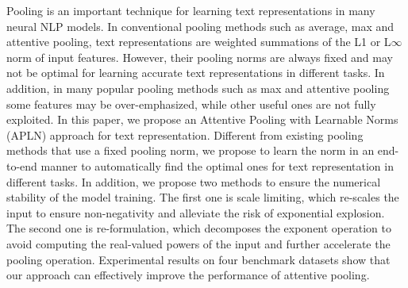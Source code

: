 Pooling is an important technique for learning text representations in many neural NLP models. In conventional pooling methods such as average, max and attentive pooling, text representations are weighted summations of the L1 or L{\mbox{$\infty$}} norm of input features. However, their pooling norms are always fixed and may not be optimal for learning accurate text representations in different tasks. In addition, in many popular pooling methods such as max and attentive pooling some features may be over-emphasized, while other useful ones are not fully exploited. In this paper, we propose an Attentive Pooling with Learnable Norms (APLN) approach for text representation. Different from existing pooling methods that use a fixed pooling norm, we propose to learn the norm in an end-to-end manner to automatically find the optimal ones for text representation in different tasks. In addition,  we propose two methods to ensure the numerical stability of the model training. The first one is scale limiting, which re-scales the input to ensure non-negativity and alleviate the risk of exponential explosion. The second one is re-formulation, which decomposes the exponent operation to avoid computing the real-valued powers of the input and further accelerate the pooling operation. Experimental results on four benchmark datasets show that our approach can effectively improve the performance of attentive pooling.
